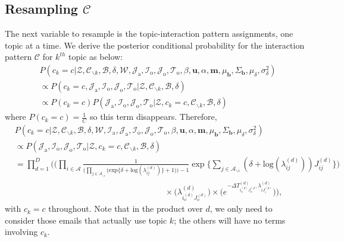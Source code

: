 \documentclass[a4paper]{article}
\begin{document}
 \subsection{Resampling $\mathcal{C}$} \label{subsec: Resampling C}
 The next variable to resample is the topic-interaction pattern assignments, one topic at a time. We derive the posterior conditional probability for the interaction pattern $\mathcal{C}$ for $k^{th}$ topic as below:
 \begin{equation}
 \begin{aligned} & P(c_k=c|\mathcal{Z},   \mathcal{C}_{\backslash k},   \mathcal{B},\delta,\mathcal{W}, \mathcal{J}_{\mbox{a}}, \mathcal{I}_{\mbox{o}}, \mathcal{J}_{\mbox{o}}, \mathcal{T}_{\mbox{o}}, \beta, \boldsymbol{u}, \alpha, \boldsymbol{m},  \mu_{\boldsymbol{b}}, \Sigma_{\boldsymbol{b}}, \mu_\delta, \sigma^2_\delta)\\
 &\propto P(c_k=c, \mathcal{J}_{\mbox{a}}, \mathcal{I}_{\mbox{o}}, \mathcal{J}_{\mbox{o}}, \mathcal{T}_{\mbox{o}}|\mathcal{Z}, \mathcal{C}_{\backslash k},   \mathcal{B},\delta)\\
& \propto P(c_k=c)P(\mathcal{J}_{\mbox{a}}, \mathcal{I}_{\mbox{o}}, \mathcal{J}_{\mbox{o}}, \mathcal{T}_{\mbox{o}}| \mathcal{Z}, c_k=c, \mathcal{C}_{\backslash k}, \mathcal{B}, \delta)
 \end{aligned}
 \end{equation}
 where $P(c_k=c) = \frac{1}{C}$ so this term disappears. Therefore, 
 \begin{equation}
 \begin{aligned}
 &P(c_k=c|\mathcal{Z},   \mathcal{C}_{\backslash k},   \mathcal{B}, \delta, \mathcal{W}, \mathcal{I}_{\mbox{a}}, \mathcal{J}_{\mbox{a}}, \mathcal{I}_{\mbox{o}}, \mathcal{J}_{\mbox{o}}, \mathcal{T}_{\mbox{o}}, \beta, \boldsymbol{u}, \alpha, \boldsymbol{m},  \mu_{\boldsymbol{b}}, \Sigma_{\boldsymbol{b}}, \mu_\delta, \sigma^2_\delta)\\&\propto P( \mathcal{J}_{\mbox{a}}, \mathcal{I}_{\mbox{o}}, \mathcal{J}_{\mbox{o}}, \mathcal{T}_{\mbox{o}}| \mathcal{Z}, c_k=c, \mathcal{C}_{\backslash k}, \mathcal{B}, \delta)\\&=\prod_{d=1}^D\Bigg(\Big(\prod_{i\in \mathcal{A}} \frac{1}{\Big(\prod_{j \in \mathcal{A}_{\backslash i}} \Big(\mbox{exp}\{\delta+\mbox{log}(\lambda_{ij}^{(d)})\} + 1\Big)\Big)-1}\exp\Big\{\sum_{j \in \mathcal{A}_{\backslash i}} (\delta+\mbox{log}(\lambda_{ij}^{(d)}))J_{ij}^{(d)} \Big\}\Big)\\&\quad\quad\quad\quad\quad\quad\quad\quad\quad\quad\quad\quad\quad\quad\quad\quad\quad\quad\times \Big(\lambda^{(d)}_{i_o^{(d)}J_{o}^{(d)}}\Big)\times \Big(e^{-\Delta T^{(d)}_{i_o^{(d)}J_o^{(d)}}\lambda^{(d)}_{iJ^{(d)}_{i}}}\Big)\Bigg),
 \end{aligned}
 \end{equation} 
 with $c_k=c$ throughout. Note that in the product over $d$, we only need to consider those emails that actually use topic $k$; the others will have no terms involving $c_k$.
\end{document}
